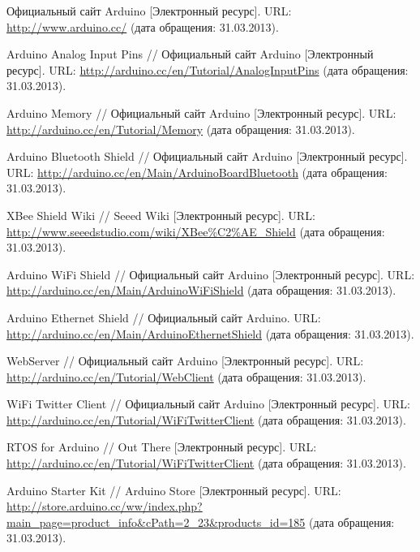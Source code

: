 \documentclass[twoside,a4paper]{msmb} %
\begin{document}
\begin{thebibliography}{99}
Официальный сайт Arduino [Электронный ресурс].
URL: \url{http://www.arduino.cc/} (дата обращения: 31.03.2013).

Arduino Analog Input Pins // Официальный сайт Arduino [Электронный ресурс]. 
URL: \url{http://arduino.cc/en/Tutorial/AnalogInputPins} (дата обращения: 31.03.2013).

Arduino Memory // Официальный сайт Arduino [Электронный ресурс]. 
URL: \url{http://arduino.cc/en/Tutorial/Memory} (дата обращения: 31.03.2013).

Arduino Bluetooth Shield // Официальный сайт Arduino [Электронный ресурс]. 
URL: \url{http://arduino.cc/en/Main/ArduinoBoardBluetooth} (дата обращения: 31.03.2013).

XBee Shield Wiki // Seeed Wiki [Электронный ресурс]. 
URL: \url{http://www.seeedstudio.com/wiki/XBee\%C2\%AE_Shield} (дата обращения: 31.03.2013).

Arduino WiFi Shield // Официальный сайт Arduino [Электронный ресурс].  
URL: \url{http://arduino.cc/en/Main/ArduinoWiFiShield} (дата обращения: 31.03.2013).

Arduino Ethernet Shield // Официальный сайт Arduino.  
URL: \url{http://arduino.cc/en/Main/ArduinoEthernetShield} (дата обращения: 31.03.2013).

WebServer // Официальный сайт Arduino [Электронный ресурс].  
URL: \url{http://arduino.cc/en/Tutorial/WebClient} (дата обращения: 31.03.2013).

WiFi Twitter Client // Официальный сайт Arduino [Электронный ресурс].  
URL: \url{http://arduino.cc/en/Tutorial/WiFiTwitterClient} (дата обращения: 31.03.2013).

RTOS for Arduino // Out There [Электронный ресурс].  
URL: \url{http://arduino.cc/en/Tutorial/WiFiTwitterClient} (дата обращения: 31.03.2013).

Arduino Starter Kit // Arduino Store [Электронный ресурс].  
URL: \url{http://store.arduino.cc/ww/index.php?main_page=product_info&cPath=2_23&products_id=185} (дата обращения: 31.03.2013).



\end{thebibliography}
\end{document}
